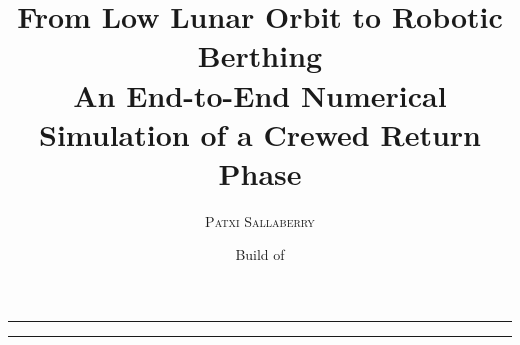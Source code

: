 \documentclass[11pt,a4paper]{article}
\title{\vspace{-14mm}\textbf{\large From Low Lunar Orbit to Robotic Berthing}\\[2mm]
       \large An End-to-End Numerical Simulation of a Crewed Return Phase}
\author{\textsc{Patxi Sallaberry}}
\date{\small Build of \mBuildDate}
\begin{document}
\maketitle
\thispagestyle{empty}
\noindent\textcolor{rule}{\rule{\textwidth}{1pt}}



\vspace{2mm}
\noindent\textcolor{rule}{\rule{\textwidth}{0.6pt}}
\vspace{2mm}

{\small\tableofcontents}

\clearpage

\clearpage

\clearpage

\clearpage

\clearpage

\clearpage

\clearpage

\clearpage




\end{document}
